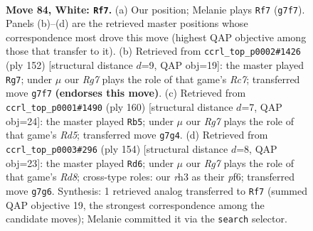 \documentclass[11pt]{article}
\begin{document}
\clearpage

\begin{figure}[p]\centering
\begin{subfigure}{0.46\textwidth}\centering
\resizebox{\linewidth}{!}{%
\newchessgame
\chessboard[
  setfen={8/6R1/3kn3/P7/8/7r/4K3/8 w - - 15 84},
  showmover=false,
  pgfstyle=straightmove, color=movearrow, markmove={g7-f7}
]}
\caption{}
\end{subfigure}\hfill
\begin{subfigure}{0.46\textwidth}\centering
\resizebox{\linewidth}{!}{%
\newchessgame
\chessboard[
  setfen={5r2/2R5/8/3n4/8/P4k2/7K/8 w - - 18 77},
  showmover=false,
  pgfstyle=straightmove, color=movearrow, markmove={c7-g7}
]}
\caption{}
\end{subfigure}
\\[4pt]
\begin{subfigure}{0.46\textwidth}\centering
\resizebox{\linewidth}{!}{%
\newchessgame
\chessboard[
  setfen={8/8/8/3R4/5nk1/8/2K5/8 w - - 8 81},
  showmover=false,
  pgfstyle=straightmove, color=movearrow, markmove={d5-b5}
]}
\caption{}
\end{subfigure}\hfill
\begin{subfigure}{0.46\textwidth}\centering
\resizebox{\linewidth}{!}{%
\newchessgame
\chessboard[
  setfen={3R4/5k2/4np2/8/4K3/8/6P1/8 w - - 13 78},
  showmover=false,
  pgfstyle=straightmove, color=movearrow, markmove={d8-d6}
]}
\caption{}
\end{subfigure}
\caption{\textbf{Move 84, White: \texttt{Rf7}.} (a) Our position; Melanie plays \texttt{Rf7} (\texttt{g7f7}). Panels (b)--(d) are the retrieved master positions whose correspondence most drove this move (highest QAP objective among those that transfer to it). (b) Retrieved from \texttt{ccrl\_top\_p0002\#1426} (ply 152) [structural distance $d$=9, QAP obj=19]: the master played \texttt{Rg7}; under $\mu$ our \emph{Rg7} plays the role of that game's \emph{Rc7}; transferred move \texttt{g7f7} \textbf{(endorses this move)}. (c) Retrieved from \texttt{ccrl\_top\_p0001\#1490} (ply 160) [structural distance $d$=7, QAP obj=24]: the master played \texttt{Rb5}; under $\mu$ our \emph{Rg7} plays the role of that game's \emph{Rd5}; transferred move \texttt{g7g4}. (d) Retrieved from \texttt{ccrl\_top\_p0003\#296} (ply 154) [structural distance $d$=8, QAP obj=23]: the master played \texttt{Rd6}; under $\mu$ our \emph{Rg7} plays the role of that game's \emph{Rd8}; cross-type roles: our \emph{r}h3 as their \emph{p}f6; transferred move \texttt{g7g6}. Synthesis: 1 retrieved analog transferred to \texttt{Rf7} (summed QAP objective 19, the strongest correspondence among the candidate moves); Melanie committed it via the \texttt{search} selector.}
\label{fig:thought-m166}
\end{figure}
\end{document}
